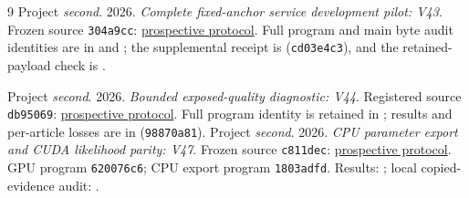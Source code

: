 \documentclass[10pt,twocolumn,letterpaper]{article}
\begin{document}
\begin{thebibliography}{9}
Project \emph{second}. 2026. \emph{Complete fixed-anchor service development
pilot: V43}. Frozen source \texttt{304a9cc}:
\href{https://github.com/priyankjairaj100/second/blob/304a9cc73b3c263032f3ef6a02487b4d2df40fbe/research_v43/PROTOCOL.txt}{prospective protocol}.
Full program and main byte audit identities are in
 and
;
the supplemental receipt is
(\texttt{cd03e4c3}), and the retained-payload check is
.

Project \emph{second}. 2026. \emph{Bounded exposed-quality diagnostic: V44}.
Registered source \texttt{db95069}:
\href{https://github.com/priyankjairaj100/second/blob/db95069b2c3484ac615052fb1c1a711c8c773c2d/research_v44/PROTOCOL.txt}{prospective protocol}.
Full program identity is retained in
; results and
per-article losses are in
(\texttt{98870a81}).
Project \emph{second}. 2026. \emph{CPU parameter export and CUDA likelihood parity: V47}.
Frozen source \texttt{c811dec}:
\href{https://github.com/priyankjairaj100/second/blob/c811dec/research_v47/PROTOCOL.txt}{prospective protocol}.
GPU program \texttt{620076c6}; CPU export program \texttt{1803adfd}.
Results: ;
local copied-evidence audit: .

\end{thebibliography}
\end{document}
